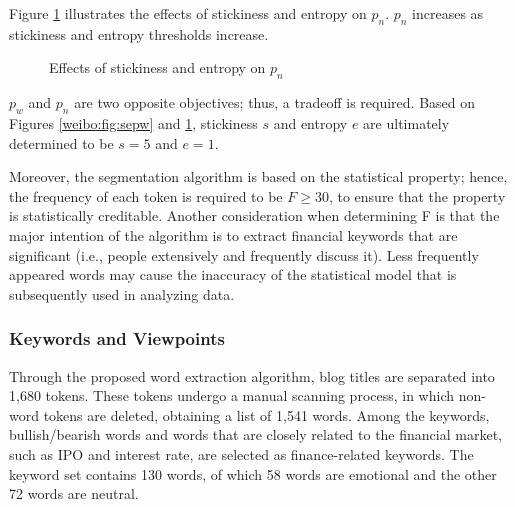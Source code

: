 \documentclass[review,3p,times,12pt,number]{elsarticle}
\begin{document}
Figure \ref{weibo:fig:sepn} illustrates the effects of stickiness and entropy on $p_n$. $p_n$ increases as stickiness and entropy thresholds increase.
\begin{figure}[htbp]
\centering
    \label{weibo:fig:sepn}
\caption{Effects of stickiness and entropy on $p_n$}
\end{figure}

$p_w$ and $p_n$ are two opposite objectives; thus, a tradeoff is required. Based on Figures \ref{weibo:fig:sepw} and \ref{weibo:fig:sepn}, stickiness $s$ and entropy $e$ are ultimately determined to be $s=5$ and $e=1$.

Moreover, the segmentation algorithm is based on the statistical property; hence, the frequency of each token is required to be $F\ge30$, to ensure that the property is statistically creditable. Another consideration when determining F is that the major intention of the algorithm is to extract financial keywords that are significant  (i.e., people extensively and frequently discuss it). Less frequently appeared words may cause the inaccuracy of the statistical model that is subsequently used in analyzing data.

\subsubsection{Keywords and Viewpoints}
Through the proposed word extraction algorithm, blog titles are separated into 1,680 tokens. These tokens undergo a manual scanning process, in which non-word tokens are deleted, obtaining a list of 1,541 words.
Among the keywords, bullish/bearish words and words that are closely related to the financial market, such as IPO and interest rate, are selected as finance-related keywords. The keyword set contains 130 words, of which 58 words are emotional and the other 72 words are neutral.
\end{document}
